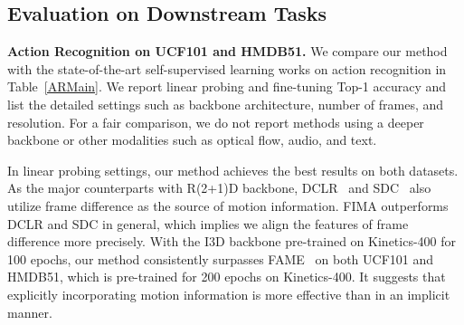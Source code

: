 \documentclass[sigconf,screen]{acmart}
\begin{document}
\begin{table}[tbp]
\normalsize
\renewcommand\arraystretch{1.0}
\setlength{\tabcolsep}{5.6mm}
\centering
\caption{Action recognition performance on Diving-48. All models are pre-trained on Kinetics-400.}
\label{ARDiving}
\end{table}

\subsection{Evaluation on Downstream Tasks}

\noindent
{\bf Action Recognition on UCF101 and HMDB51.} We compare our method with the state-of-the-art self-supervised learning works on action recognition in Table~\ref{ARMain}. We report linear probing and fine-tuning Top-1 accuracy and list the detailed settings such as backbone architecture, number of frames, and resolution. For a fair comparison, we do not report methods using a deeper backbone or other modalities such as optical flow, audio, and text.

In linear probing settings, our method achieves the best results on both datasets. As the major counterparts with R(2+1)D backbone, DCLR~\cite{Dual} and SDC~\cite{Static} also utilize frame difference as the source of motion information. FIMA outperforms DCLR and SDC in general, which implies we align the features of frame difference more precisely. With the I3D backbone pre-trained on Kinetics-400 for 100 epochs, our method consistently surpasses FAME~\cite{FAME} on both UCF101 and HMDB51, which is pre-trained for 200 epochs on Kinetics-400. It suggests that explicitly incorporating motion information is more effective than in an implicit manner.
\end{document}
